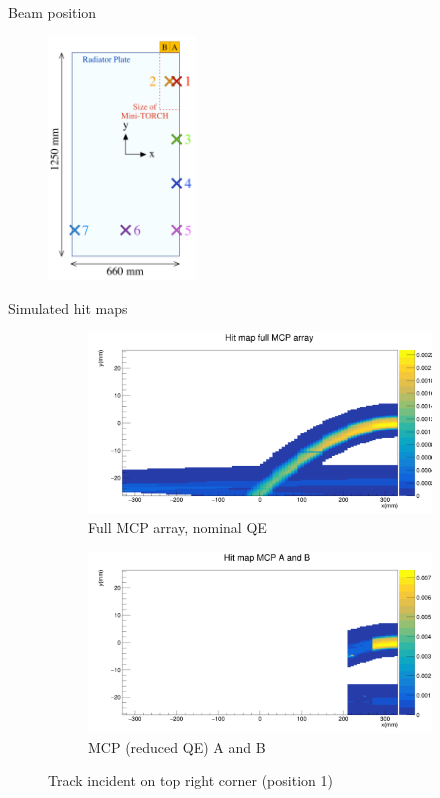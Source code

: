 \documentclass{beamer}
\begin{document}
\begin{frame}{Beam position}
  \begin{figure}
    \centering
    \includegraphics[width = 0.35\textwidth]{Plots/BeamPosition}
  \end{figure}
\end{frame}

\begin{frame}{Simulated hit maps}
  \begin{figure}
    \centering
    \vspace{-0.2cm}
    \begin{subfigure}{0.5\textwidth}
      \includegraphics[width = 1.0\textwidth]{Plots/HitMapMCPFull.png}
      \caption{Full MCP array, nominal QE}
    \end{subfigure}%
    \begin{subfigure}{0.5\textwidth}
      \includegraphics[width = 1.0\textwidth]{Plots/HitMapMCPAB.png}
      \caption{MCP (reduced QE) A and B}
    \end{subfigure}
    \caption{Track incident on top right corner (position 1)}
  \end{figure}
\end{frame}
\end{document}
